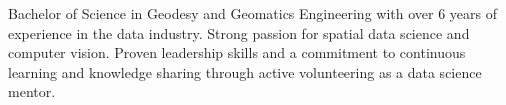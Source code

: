 Bachelor of Science in Geodesy and Geomatics Engineering with over 6 years of experience in the data industry. Strong passion for spatial data science and computer vision. Proven leadership skills and a commitment to continuous learning and knowledge sharing through active volunteering as a data science mentor.
